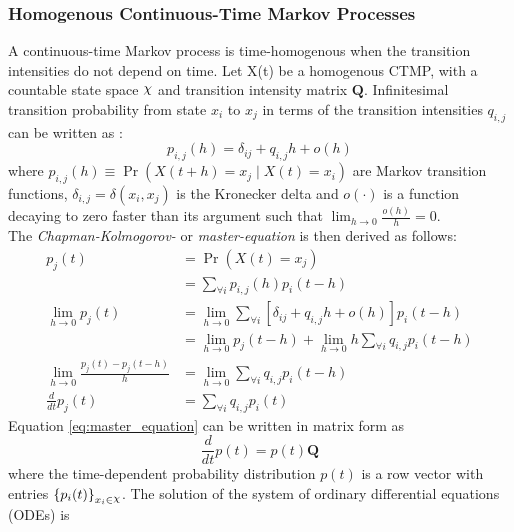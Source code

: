 \subsubsection{Homogenous Continuous-Time Markov Processes}
\label{sec:homo_CTMP}
A continuous-time Markov process is time-homogenous when the transition intensities do not depend on time. Let X(t) be a homogenous CTMP, with a countable state space $ \rchi $ and transition intensity matrix $ \textbf{Q} $. Infinitesimal transition probability from state $ x_{i} $ to $ x_{j} $ in terms of the transition intensities $ q_{i,j} $ can be written as \cite{Cohn2010a}:
\begin{equation}
p_{i,j}(h)=\delta_{ij}+q_{i,j} h+o(h)
\label{eq:Markov_trans_func}
\end{equation}
where $ p_{i, j}(h) \equiv \operatorname{Pr}(X(t+h)=x_j\mid X(t)=x_i) $ are Markov transition functions, $ \delta_{i,j} = \delta(x_i,x_j)$ is the Kronecker delta and $ o(\cdot) $ is a function decaying to zero faster than its argument such that $ \lim_{h \to 0} \frac{o(h)}{h} = 0 $.\\
The \textit{Chapman-Kolmogorov-} or \textit{master-equation} is then derived as follows:
\begin{align}
p_{j}(t) &= \operatorname{Pr}(X(t) = x_{j}) \nonumber\\
& =\sum_{\forall i} p_{i, j}(h) p_{i}(t-h) \nonumber \\
\lim_{h\rightarrow 0} p_{j}(t) 
& = \lim_{h\rightarrow 0} \sum_{\forall i} \left[ \delta_{ij}+q_{i,j} h+o(h)\right]  p_{i}(t-h) \nonumber \\ 
& = \lim_{h\rightarrow 0} p_{j}(t-h) + \lim_{h\rightarrow 0} h \sum_{\forall i} q_{i,j} p_{i}(t-h) \nonumber \\
\lim_{h\rightarrow 0} \frac{p_{j}(t) - p_{j}(t-h)}{h} 
&= \lim_{h\rightarrow 0} \sum_{\forall i} q_{i,j} p_{i}(t-h) \nonumber\\
\frac{d}{dt} p_{j}(t) & = \sum_{\forall i} q_{i,j} p_{i}(t)
\label{eq:master_equation}
\end{align}
Equation \ref{eq:master_equation} can be written in matrix form as
\begin{equation}
\frac{d}{dt} p(t) = p(t)\textbf{Q}
\end{equation}
where the time-dependent probability distribution $ p(t) $ is a row vector with entries $ \left\lbrace p_{i}(t)\right\rbrace_{x_{i}\in \rchi} $. The solution of the system of ordinary differential equations (ODEs) is

